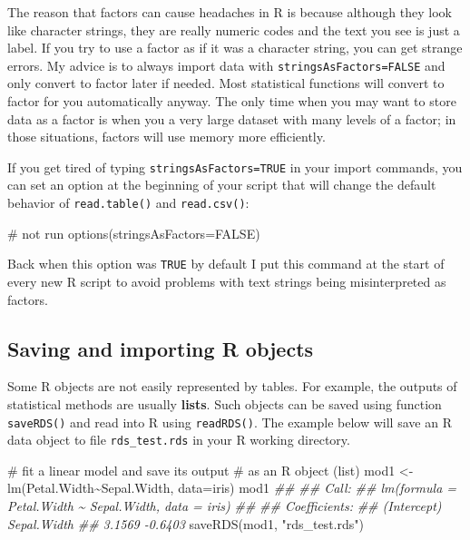 \documentclass[
  13,
  letterpaper,
]{report}
\newenvironment{Shaded}{\begin{snugshade}}{\end{snugshade}}
\newcommand{\AttributeTok}[1]{\textcolor[rgb]{0.40,0.45,0.13}{#1}}
\newcommand{\CommentTok}[1]{\textcolor[rgb]{0.37,0.37,0.37}{#1}}
\newcommand{\ConstantTok}[1]{\textcolor[rgb]{0.56,0.35,0.01}{#1}}
\newcommand{\DocumentationTok}[1]{\textcolor[rgb]{0.37,0.37,0.37}{\textit{#1}}}
\newcommand{\FunctionTok}[1]{\textcolor[rgb]{0.28,0.35,0.67}{#1}}
\newcommand{\NormalTok}[1]{\textcolor[rgb]{0.00,0.23,0.31}{#1}}
\newcommand{\OtherTok}[1]{\textcolor[rgb]{0.00,0.23,0.31}{#1}}
\newcommand{\SpecialCharTok}[1]{\textcolor[rgb]{0.37,0.37,0.37}{#1}}
\newcommand{\StringTok}[1]{\textcolor[rgb]{0.13,0.47,0.30}{#1}}
\begin{document}
The reason that factors can cause headaches in R is because although
they look like character strings, they are really numeric codes and the
text you see is just a label. If you try to use a factor as if it was a
character string, you can get strange errors. My advice is to always
import data with \texttt{stringsAsFactors=FALSE} and only convert to
factor later if needed. Most statistical functions will convert to
factor for you automatically anyway. The only time when you may want to
store data as a factor is when you a very large dataset with many levels
of a factor; in those situations, factors will use memory more
efficiently.

If you get tired of typing \texttt{stringsAsFactors=TRUE} in your import
commands, you can set an option at the beginning of your script that
will change the default behavior of \texttt{read.table()} and
\texttt{read.csv()}:

\begin{Shaded}
\begin{Highlighting}[]
\CommentTok{\# not run}
\FunctionTok{options}\NormalTok{(}\AttributeTok{stringsAsFactors=}\ConstantTok{FALSE}\NormalTok{)}
\end{Highlighting}
\end{Shaded}

Back when this option was \texttt{TRUE} by default I put this command at
the start of every new R script to avoid problems with text strings
being misinterpreted as factors.

\subsection{Saving and importing R objects}\label{sec-ie-import-object}

Some R objects are not easily represented by tables. For example, the
outputs of statistical methods are usually \textbf{lists}. Such objects
can be saved using function \texttt{saveRDS()} and read into R using
\texttt{readRDS()}. The example below will save an R data object to file
\texttt{rds\_test.rds} in your R working directory.

\begin{Shaded}
\begin{Highlighting}[]
\CommentTok{\# fit a linear model and save its output}
\CommentTok{\# as an R object (list)}
\NormalTok{mod1 }\OtherTok{\textless{}{-}} \FunctionTok{lm}\NormalTok{(Petal.Width}\SpecialCharTok{\textasciitilde{}}\NormalTok{Sepal.Width, }\AttributeTok{data=}\NormalTok{iris)}
\NormalTok{mod1}
\DocumentationTok{\#\# }
\DocumentationTok{\#\# Call:}
\DocumentationTok{\#\# lm(formula = Petal.Width \textasciitilde{} Sepal.Width, data = iris)}
\DocumentationTok{\#\# }
\DocumentationTok{\#\# Coefficients:}
\DocumentationTok{\#\# (Intercept)  Sepal.Width  }
\DocumentationTok{\#\#      3.1569      {-}0.6403}
\FunctionTok{saveRDS}\NormalTok{(mod1, }\StringTok{"rds\_test.rds"}\NormalTok{)}
\end{Highlighting}
\end{Shaded}
\end{document}
